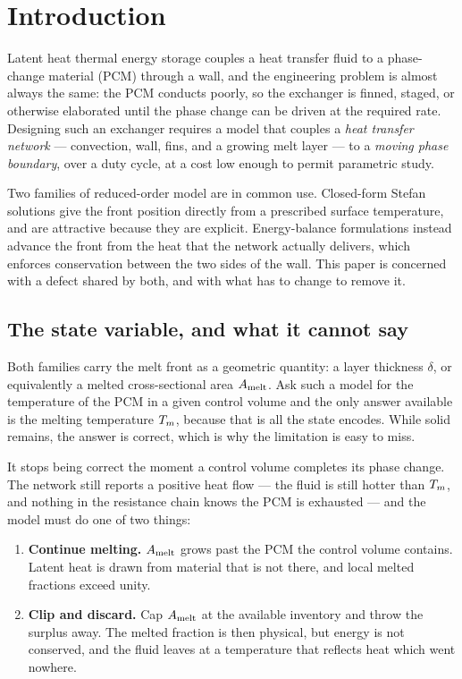 \section{Introduction}
\label{sec:intro}

Latent heat thermal energy storage couples a heat transfer fluid to a
phase-change material (PCM) through a wall, and the engineering problem is
almost always the same: the PCM conducts poorly, so the exchanger is finned,
staged, or otherwise elaborated until the phase change can be driven at the
required rate. Designing such an exchanger requires a model that couples a
\emph{heat transfer network} --- convection, wall, fins, and a growing melt
layer --- to a \emph{moving phase boundary}, over a duty cycle, at a cost low
enough to permit parametric study.

Two families of reduced-order model are in common use. Closed-form Stefan
solutions give the front position directly from a prescribed surface
temperature, and are attractive because they are explicit. Energy-balance
formulations instead advance the front from the heat that the network actually
delivers, which enforces conservation between the two sides of the wall. This
paper is concerned with a defect shared by both, and with what has to change to
remove it.

\subsection{The state variable, and what it cannot say}

Both families carry the melt front as a geometric quantity: a layer thickness
$\delta$, or equivalently a melted cross-sectional area $A_{\mathrm{melt}}$. Ask such a
model for the temperature of the PCM in a given control volume and the only
answer available is the melting temperature $T_{m}$, because that is all the state
encodes. While solid remains, the answer is correct, which is why the limitation
is easy to miss.

It stops being correct the moment a control volume completes its phase change.
The network still reports a positive heat flow --- the fluid is still hotter
than $T_{m}$, and nothing in the resistance chain knows the PCM is exhausted ---
and the model must do one of two things:

\begin{enumerate}[leftmargin=1.8em,itemsep=2pt]
\item \textbf{Continue melting.} $A_{\mathrm{melt}}$ grows past the PCM the control volume
  contains. Latent heat is drawn from material that is not there, and local
  melted fractions exceed unity.
\item \textbf{Clip and discard.} Cap $A_{\mathrm{melt}}$ at the available inventory and
  throw the surplus away. The melted fraction is then physical, but energy is
  not conserved, and the fluid leaves at a temperature that reflects heat which
  went nowhere.
\end{enumerate}

